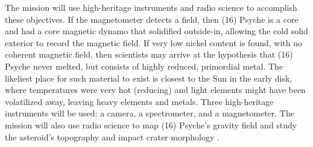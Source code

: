 The mission will use high-heritage instruments and radio science to accomplish these objectives. If the magnetometer detects a field, then (16) Psyche is a core and had a core magnetic dynamo that solidified outside-in, allowing the cold solid exterior to record the magnetic field. If very low nickel content is found, with no coherent magnetic field, then scientists may arrive at the hypothesis that (16) Psyche never melted, but consists of highly reduced, primordial metal. The likeliest place for such material to exist is closest to the Sun in the early disk, where temperatures were very hot (reducing) and light elements might have been volatilized away, leaving heavy elements and metals. Three high-heritage instruments will be used: a camera, a spectrometer, and a magnetometer. The mission will also use radio science to map (16) Psyche's gravity field and study the asteroid's topography and impact crater morphology \cite{Hart2018}.



%


